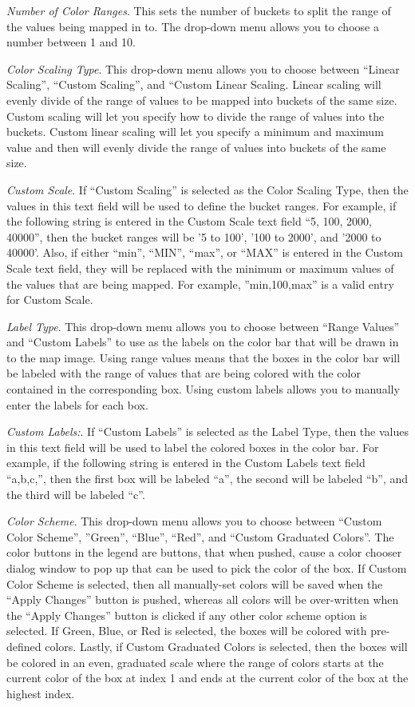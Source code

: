 \emph{Number of Color Ranges}. 
This sets the number of buckets to split the range of the values 
being mapped in to. The drop-down menu allows you to choose a 
number between 1 and 10.

\emph{Color Scaling Type}. 
This drop-down menu allows you to choose between ``Linear Scaling'',
 ``Custom Scaling'', and ``Custom Linear Scaling. Linear 
scaling will evenly divide of the 
range of values to be mapped into buckets of the same size.  
Custom scaling will let you specify how to divide the range of values 
into the buckets. Custom linear scaling will let you specify a minimum 
and maximum value and then will evenly divide the range of values into
buckets of the same size.

\emph{Custom Scale}. 
If ``Custom Scaling'' is selected as the Color Scaling Type, then 
the values in this text field will be used to define the bucket 
ranges. For example, if the following string is entered in 
the Custom Scale text field ``5, 100, 2000, 40000'', then the bucket 
ranges will be '5 to 100', '100 to 2000', and '2000 to 40000'.  
Also, if either ``min'', ``MIN'', ``max'', or ``MAX'' is entered in the 
Custom Scale text field, they will be replaced with the minimum 
or maximum values of the values that are being mapped. For example, 
''min,100,max'' is a valid entry for Custom Scale.

\emph{Label Type}. 
This drop-down menu allows 
you to choose between ``Range Values'' and 
``Custom Labels'' to use as the labels on the color bar that will 
be drawn in to the map image. Using range values means that the 
boxes in the color bar will be labeled with the range of values that 
are being colored with the color contained in the corresponding box. 
Using custom labels allows you to manually enter the labels 
for each box.

\emph{Custom Labels:}. 
If ``Custom Labels'' is 
selected as the Label Type, then the values 
in this text field will be used to label the colored boxes in the 
color bar. For example, if the following string is entered in 
the Custom Labels text field ``a,b,c,'', then the first box will 
be labeled ``a'', the second will be labeled ``b'', and the third 
will be labeled ``c''.

\emph{Color Scheme}. 
This drop-down menu allows you to choose between ``Custom Color Scheme'', 
''Green'', ``Blue'', ``Red'', and ``Custom Graduated Colors''. The color 
buttons in the legend are buttons, that when pushed, cause a color 
chooser dialog window to pop up that can be used to pick the color of 
the box. If Custom Color Scheme is selected, then all manually-set colors 
will be saved when the ``Apply Changes'' button is pushed, whereas all colors 
will be over-written when the ``Apply Changes'' button is clicked if any other 
color scheme option is selected. If Green, Blue, or Red is selected, the 
boxes will be colored with pre-defined colors. Lastly, if Custom Graduated 
Colors is selected, then the boxes will be colored in an even, graduated 
scale where the range of colors starts at the current color of the box at 
index 1 and ends at the current color of the box at the highest index.

